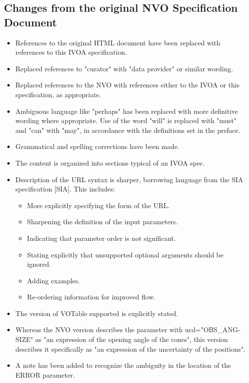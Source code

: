 \documentclass[11pt,a4paper]{ivoa}
\begin{document}
\subsection*{Changes from the original NVO Specification Document}
\label{appendix:nvochanges}
\begin{itemize}
	\item References to the original HTML document have been replaced 
		with references to this IVOA specification.
	\item Replaced references to "curator" with "data
		provider" or similar wording.
	\item Replaced references to the NVO with
		references either to the IVOA or this specification, as appropriate.
	\item Ambiguous language like "perhaps" has been replaced with more
		definitive wording where appropriate. Use of the word "will" is replaced
		with "must" and "can" with "may", in accordance with the definitions set
		in the preface.
	\item Grammatical and spelling corrections have been made.
	\item The content is organized into sections typical of an IVOA spec.
	\item Description of the URL syntax is sharper, borrowing language
		from the SIA specification [SIA]. This includes:
		\begin{itemize}
			\item More explicitly specifying the form of the URL.
			\item Sharpening the definition of the input parameters.
			\item Indicating that parameter order is not significant.
			\item Stating explicitly that unsupported optional arguments
				should be ignored.
			\item Adding examples.
			\item Re-ordering information for improved flow.
		\end{itemize}
	\item The version of VOTable supported is explicitly stated.
	\item Whereas the NVO	version describes the parameter with
		ucd="OBS\_ANG-SIZE" as "an
		expression of the opening angle of the cones", this version describes it
		specifically as "an expression of the uncertainty of the positions".
	\item A note has been added to recognize the ambiguity in the location
		of the ERROR parameter.

\end{itemize}
\end{document}
